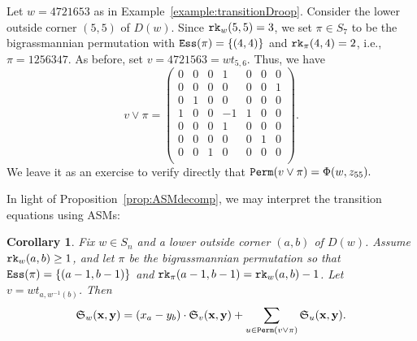 \documentclass[12pt,reqno]{amsart}
\newtheorem{corollary}[theorem]{Corollary}
\newtheorem{Main Conjecture}[theorem]{Main Conjecture}
\theoremstyle{remark}
\newenvironment{example}
  {\pushQED{\qed}\renewcommand{\qedsymbol}{$\diamondsuit$}\examplex}
  {\popQED\endexamplex}
\theoremstyle{plain}
\newcommand{\ess}{{\tt Ess}}
\newcommand{\perm}{{\tt Perm}}
\newcommand{\rk}{{\tt rk}}
\begin{document}
\begin{example}
Let $w=4721653$ as in Example~\ref{example:transitionDroop}.  Consider the lower outside corner $(5,5)$ of $D(w)$.  Since $\rk_w(5,5)=3$, we set $\pi \in S_7$ to be the bigrassmannian permutation with $\ess(\pi)=\{(4,4)\}$ and $\rk_\pi(4,4)=2$, i.e.,\ $\pi=1256347$.  As before, set $v=4721563 = wt_{5,6}$.  Thus, we have 
\[v\vee \pi=
\begin{pmatrix}
0&0&0&1&0&0&0\\
0&0&0&0&0&0&1\\
0&1&0&0&0&0&0\\
1&0&0&-1&1&0&0\\
0&0&0&1&0&0&0\\
0&0&0&0&0&1&0\\
0&0&1&0&0&0&0\\
\end{pmatrix}.
\]
We leave it as an exercise to verify directly that $\perm(v\vee \pi)=\Phi(w,z_{55}).$ 
\end{example}

In light of Proposition~\ref{prop:ASMdecomp}, we may interpret the transition equations using ASMs: 

\begin{corollary}  \label{cor:transitionWithPerm} Fix $w \in S_n$ and a lower outside corner $(a,b)$ of $D(w)$.
Assume $\rk_w(a,b)\geq 1$, and let $\pi$ be the bigrassmannian permutation so that $\ess(\pi)=\{(a-1,b-1)\}$ and $\rk_\pi(a-1,b-1)=\rk_w(a,b)-1$.  Let $v=wt_{a,w^{-1}(b)}$.  Then \[\mathfrak S_w(\mathbf x, \mathbf y)=(x_a-y_b)\cdot \mathfrak S_v(\mathbf x, \mathbf y)+\sum_{u\in \perm(v\vee \pi)} \mathfrak S_{u}(\mathbf x, \mathbf y).\]
\end{corollary}
\end{document}
